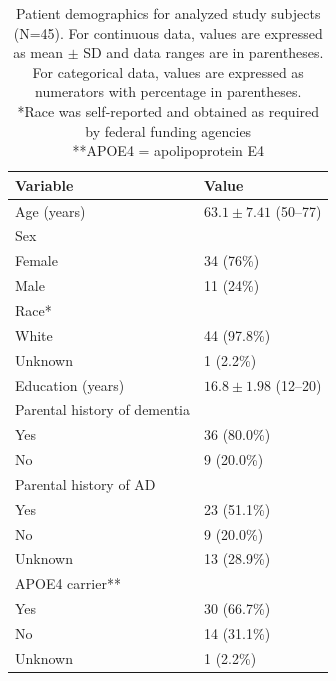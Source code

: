 \begin{table}[ht]
    \centering
    \caption[Patient demographics]{Patient demographics for analyzed study subjects (N=45). For continuous data, values are expressed as mean $\pm$ SD and data ranges are in parentheses. For categorical data, values are expressed as numerators with percentage in parentheses. \\
    *Race was self-reported and obtained as required by federal funding agencies \\
    **APOE4 = apolipoprotein E4}\label{tab:life_demo}
    \small
    \ifFinal{}
    \fi
    \vspace{0.25cm}
    \begin{tabular}{ll}
    \toprule
    \textbf{Variable} & \textbf{Value} \\
    \midrule
    Age (years) & $63.1 \pm 7.41$ (50--77) \\
    Sex & \\
    \quad Female & 34 (76\%) \\
    \quad Male & 11 (24\%) \\

    Race* & \\
    \quad White & 44 (97.8\%) \\
    \quad Unknown & 1 (2.2\%) \\

    Education (years) & $16.8 \pm 1.98$ (12--20) \\

    Parental history of dementia & \\
    \quad Yes & 36 (80.0\%) \\
    \quad No & 9 (20.0\%) \\

    Parental history of AD & \\
    \quad Yes & 23 (51.1\%) \\
    \quad No & 9 (20.0\%) \\
    \quad Unknown & 13 (28.9\%) \\

    APOE4 carrier** & \\
    \quad Yes & 30 (66.7\%) \\
    \quad No & 14 (31.1\%) \\
    \quad Unknown & 1 (2.2\%) \\
    \bottomrule
    \end{tabular}
\end{table}

